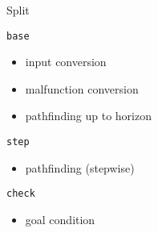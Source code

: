 \begin{frame}{Split}
    \begin{minipage}{0.5\textwidth}
        \begin{tcolorbox}[colframe=black, colback=white, sharp corners=all, boxrule=0.5mm]
            \texttt{base}
            \begin{itemize}
                \item input conversion
                \item malfunction conversion
                \item pathfinding up to horizon
            \end{itemize}
        \vspace{0.156cm} %
        \end{tcolorbox}
    \end{minipage}%
    \begin{minipage}{0.5\textwidth}
        \begin{tcolorbox}[colframe=black, colback=white, sharp corners=all, boxrule=0.5mm]
            \texttt{step}
            \begin{itemize}
                \item pathfinding (stepwise)
            \end{itemize}
        \end{tcolorbox}
        \begin{tcolorbox}[colframe=black, colback=white, sharp corners=all, boxrule=0.5mm]
            \texttt{check}
            \begin{itemize}
                \item goal condition
            \end{itemize}
        \end{tcolorbox}
    \end{minipage}
\end{frame}